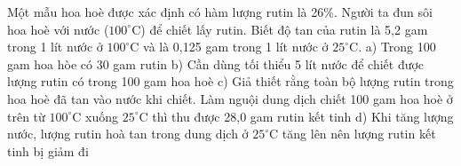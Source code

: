 \documentclass[12pt,a4paper]{article}
\begin{document}
\begin{ex}
Một mẫu hoa hoè được xác định có hàm lượng rutin là 26\%. Người ta đun sôi hoa hoè với nước ($100^\circ\text{C}$) để chiết lấy rutin. Biết độ tan của rutin là 5,2 gam trong 1 lít nước ở $100^\circ\text{C}$ và là 0,125 gam trong 1 lít nước ở $25^\circ\text{C}$.
\choiceTF
{a) Trong 100 gam hoa hòe có 30 gam rutin}
{\True b) Cần dùng tối thiểu 5 lít nước để chiết được lượng rutin có trong 100 gam hoa hoè}
{c) Giả thiết rằng toàn bộ lượng rutin trong hoa hoè đã tan vào nước khi chiết. Làm nguội dung dịch chiết 100 gam hoa hoè ở trên từ $100^\circ\text{C}$ xuống $25^\circ\text{C}$ thì thu được 28,0 gam rutin kết tinh}
{\True d) Khi tăng lượng nước, lượng rutin hoà tan trong dung dịch ở $25^\circ\text{C}$ tăng lên nên lượng rutin kết tinh bị giảm đi}

\end{ex}
\end{document}
